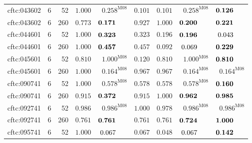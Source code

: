 \begin{longtable}{@{}lrrrrrrrr@{}}
cftc:043602 & 6 & 52 & $\mathbf{1.000}$ & $\mathbf{0.258}^{\mathrm{M08}}$ & $\mathbf{0.101}$ & $\mathbf{0.101}$ & $\mathbf{0.258}^{\mathrm{M08}}$ & $\mathbf{0.126}\hphantom{^{\mathrm{M00}}}$ \\
cftc:043602 & 6 & 260 & $\mathbf{0.773}$ & $\mathbf{0.171}\hphantom{^{\mathrm{M00}}}$ & $\mathbf{0.927}$ & $\mathbf{1.000}$ & $\mathbf{0.200}\hphantom{^{\mathrm{M00}}}$ & $\mathbf{0.221}\hphantom{^{\mathrm{M00}}}$ \\
cftc:044601 & 6 & 52 & $\mathbf{1.000}$ & $\mathbf{0.323}\hphantom{^{\mathrm{M00}}}$ & $\mathbf{0.323}$ & $\mathbf{0.196}$ & $\mathbf{0.196}\hphantom{^{\mathrm{M00}}}$ & $0.043\hphantom{^{\mathrm{M00}}}$ \\
cftc:044601 & 6 & 260 & $\mathbf{1.000}$ & $\mathbf{0.457}\hphantom{^{\mathrm{M00}}}$ & $\mathbf{0.457}$ & $0.092$ & $0.069\hphantom{^{\mathrm{M00}}}$ & $\mathbf{0.229}\hphantom{^{\mathrm{M00}}}$ \\
cftc:045601 & 6 & 52 & $\mathbf{0.810}$ & $\mathbf{1.000}^{\mathrm{M08}}$ & $\mathbf{0.120}$ & $\mathbf{0.810}$ & $\mathbf{1.000}^{\mathrm{M08}}$ & $\mathbf{0.810}\hphantom{^{\mathrm{M00}}}$ \\
cftc:045601 & 6 & 260 & $\mathbf{1.000}$ & $\mathbf{0.164}^{\mathrm{M08}}$ & $\mathbf{0.967}$ & $\mathbf{0.967}$ & $\mathbf{0.164}^{\mathrm{M08}}$ & $\mathbf{0.164}^{\mathrm{M08}}$ \\
cftc:090741 & 6 & 52 & $\mathbf{1.000}$ & $\mathbf{0.578}^{\mathrm{M08}}$ & $\mathbf{0.578}$ & $\mathbf{0.578}$ & $\mathbf{0.578}^{\mathrm{M08}}$ & $\mathbf{0.160}\hphantom{^{\mathrm{M00}}}$ \\
cftc:090741 & 6 & 260 & $\mathbf{0.915}$ & $\mathbf{0.372}\hphantom{^{\mathrm{M00}}}$ & $\mathbf{0.915}$ & $\mathbf{1.000}$ & $\mathbf{0.962}\hphantom{^{\mathrm{M00}}}$ & $\mathbf{0.985}\hphantom{^{\mathrm{M00}}}$ \\
cftc:092741 & 6 & 52 & $\mathbf{0.986}$ & $\mathbf{0.986}^{\mathrm{M08}}$ & $\mathbf{1.000}$ & $\mathbf{0.978}$ & $\mathbf{0.986}^{\mathrm{M08}}$ & $\mathbf{0.986}^{\mathrm{M08}}$ \\
cftc:092741 & 6 & 260 & $\mathbf{0.761}$ & $\mathbf{0.761}\hphantom{^{\mathrm{M00}}}$ & $\mathbf{0.761}$ & $\mathbf{0.761}$ & $\mathbf{0.724}\hphantom{^{\mathrm{M00}}}$ & $\mathbf{1.000}\hphantom{^{\mathrm{M00}}}$ \\
cftc:095741 & 6 & 52 & $\mathbf{1.000}$ & $0.067\hphantom{^{\mathrm{M00}}}$ & $0.067$ & $0.048$ & $0.067\hphantom{^{\mathrm{M00}}}$ & $\mathbf{0.142}\hphantom{^{\mathrm{M00}}}$ \\

\end{longtable}
